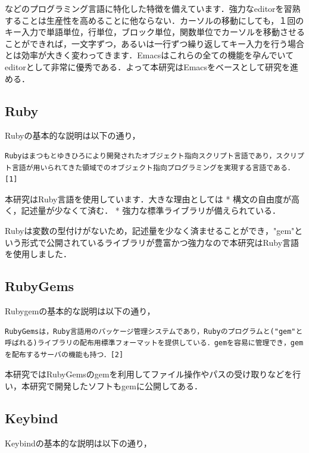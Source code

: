 \documentclass[11pt,dvipdfmx]{jsarticle}
\begin{document}
などのプログラミング言語に特化した特徴を備えています．強力なeditorを習熟することは生産性を高めることに他ならない．カーソルの移動にしても，１回のキー入力で単語単位，行単位，ブロック単位，関数単位でカーソルを移動させることができれば，一文字ずつ，あるいは一行ずつ繰り返してキー入力を行う場合とは効率が大きく変わってきます．Emacsはこれらの全ての機能を孕んでいてeditorとして非常に優秀である．よって本研究はEmacsをベースとして研究を進める．

    \subsection{Ruby}\label{ruby}

Rubyの基本的な説明は以下の通り，

\begin{verbatim}
Rubyはまつもとゆきひろにより開発されたオブジェクト指向スクリプト言語であり，スクリプト言語が用いられてきた領域でのオブジェクト指向プログラミングを実現する言語である．[1]
\end{verbatim}

本研究はRuby言語を使用しています．大きな理由としては *
構文の自由度が高く，記述量が少なくて済む． *
強力な標準ライブラリが備えられている．

Rubyは変数の型付けがないため，記述量を少なく済ませることができ，"gem"という形式で公開されているライブラリが豊富かつ強力なので本研究はRuby言語を使用しました．

    \subsection{RubyGems}\label{rubygems}

Rubygemの基本的な説明は以下の通り，

\begin{verbatim}
RubyGemsは，Ruby言語用のパッケージ管理システムであり，Rubyのプログラムと("gem"と呼ばれる)ライブラリの配布用標準フォーマットを提供している．gemを容易に管理でき，gemを配布するサーバの機能も持つ．[2]
\end{verbatim}

本研究ではRubyGemsのgemを利用してファイル操作やパスの受け取りなどを行い，本研究で開発したソフトもgemに公開してある．

    \subsection{Keybind}\label{keybind}

Keybindの基本的な説明は以下の通り，
\end{document}
